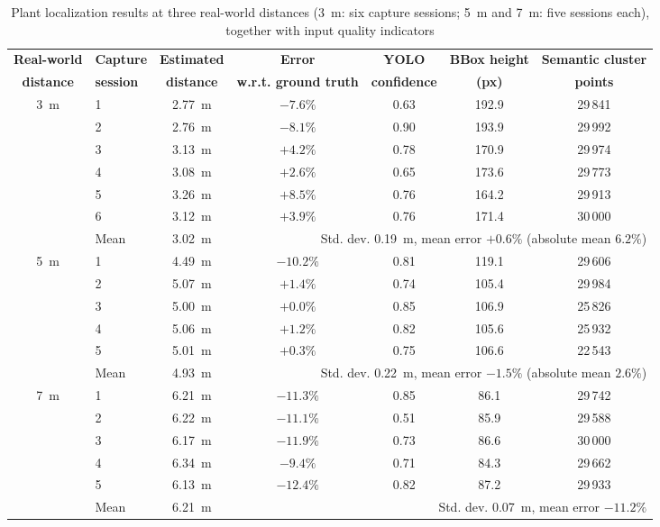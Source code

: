 \documentclass[conference]{IEEEtran}
\begin{document}
\begin{table}[t]
\centering
\small
\caption{Plant localization results at three real-world distances
(\SI{3}{\meter}: six capture sessions; \SI{5}{\meter} and \SI{7}{\meter}:
five sessions each), together with input quality indicators}
\label{tab:semantic-bearing-results}
\begin{tabular}{@{}clccccc@{}}
\toprule
\textbf{Real-world} & \textbf{Capture} & \textbf{Estimated} & \textbf{Error} & \textbf{YOLO} & \textbf{BBox height} & \textbf{Semantic cluster} \\
\textbf{distance} & \textbf{session} & \textbf{distance} & \textbf{w.r.t. ground truth} & \textbf{confidence} & \textbf{(px)} & \textbf{points} \\
\midrule
\multirow{6}{*}{\SI{3}{\meter}}
 & 1 & \SI{2.77}{\meter} & $-7.6\%$ & 0.63 & 192.9 & 29\,841 \\
 & 2 & \SI{2.76}{\meter} & $-8.1\%$ & 0.90 & 193.9 & 29\,992 \\
 & 3 & \SI{3.13}{\meter} & $+4.2\%$ & 0.78 & 170.9 & 29\,974 \\
 & 4 & \SI{3.08}{\meter} & $+2.6\%$ & 0.65 & 173.6 & 29\,773 \\
 & 5 & \SI{3.26}{\meter} & $+8.5\%$ & 0.76 & 164.2 & 29\,913 \\
 & 6 & \SI{3.12}{\meter} & $+3.9\%$ & 0.76 & 171.4 & 30\,000 \\
\cmidrule(l){2-7}
 & \multicolumn{1}{l}{Mean} & \SI{3.02}{\meter} &
 \multicolumn{4}{r}{Std. dev. \SI{0.19}{\meter}, mean error $+0.6\%$ (absolute mean $6.2\%$)} \\
\midrule
\multirow{5}{*}{\SI{5}{\meter}}
 & 1 & \SI{4.49}{\meter} & $-10.2\%$ & 0.81 & 119.1 & 29\,606 \\
 & 2 & \SI{5.07}{\meter} & $+1.4\%$  & 0.74 & 105.4 & 29\,984 \\
 & 3 & \SI{5.00}{\meter} & $+0.0\%$  & 0.85 & 106.9 & 25\,826 \\
 & 4 & \SI{5.06}{\meter} & $+1.2\%$  & 0.82 & 105.6 & 25\,932 \\
 & 5 & \SI{5.01}{\meter} & $+0.3\%$  & 0.75 & 106.6 & 22\,543 \\
\cmidrule(l){2-7}
 & \multicolumn{1}{l}{Mean} & \SI{4.93}{\meter} &
 \multicolumn{4}{r}{Std. dev. \SI{0.22}{\meter}, mean error $-1.5\%$ (absolute mean $2.6\%$)} \\
\midrule
\multirow{5}{*}{\SI{7}{\meter}}
 & 1 & \SI{6.21}{\meter} & $-11.3\%$ & 0.85 & 86.1 & 29\,742 \\
 & 2 & \SI{6.22}{\meter} & $-11.1\%$ & 0.51 & 85.9 & 29\,588 \\
 & 3 & \SI{6.17}{\meter} & $-11.9\%$ & 0.73 & 86.6 & 30\,000 \\
 & 4 & \SI{6.34}{\meter} & $-9.4\%$  & 0.71 & 84.3 & 29\,662 \\
 & 5 & \SI{6.13}{\meter} & $-12.4\%$ & 0.82 & 87.2 & 29\,933 \\
\cmidrule(l){2-7}
 & \multicolumn{1}{l}{Mean} & \SI{6.21}{\meter} &
 \multicolumn{4}{r}{Std. dev. \SI{0.07}{\meter}, mean error $-11.2\%$} \\
\bottomrule
\end{tabular}
\end{table}
\end{document}
